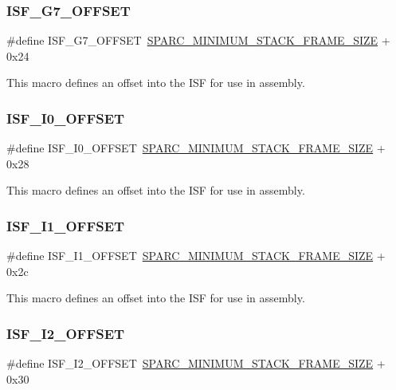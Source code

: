 \subsubsection{\texorpdfstring{ISF\_G7\_OFFSET}{ISF\_G7\_OFFSET}}
{\footnotesize\ttfamily \#define I\+S\+F\+\_\+\+G7\+\_\+\+O\+F\+F\+S\+ET~\mbox{\hyperlink{group__RTEMSScoreCPUSPARC_ga8e296685f05588131b26bdc695cb9b8c}{S\+P\+A\+R\+C\+\_\+\+M\+I\+N\+I\+M\+U\+M\+\_\+\+S\+T\+A\+C\+K\+\_\+\+F\+R\+A\+M\+E\+\_\+\+S\+I\+ZE}} + 0x24}

This macro defines an offset into the I\+SF for use in assembly. \mbox{\label{group__RTEMSScoreCPUSPARC_gace6b316101a61770e51654d9ebfac7ba}} 
\subsubsection{\texorpdfstring{ISF\_I0\_OFFSET}{ISF\_I0\_OFFSET}}
{\footnotesize\ttfamily \#define I\+S\+F\+\_\+\+I0\+\_\+\+O\+F\+F\+S\+ET~\mbox{\hyperlink{group__RTEMSScoreCPUSPARC_ga8e296685f05588131b26bdc695cb9b8c}{S\+P\+A\+R\+C\+\_\+\+M\+I\+N\+I\+M\+U\+M\+\_\+\+S\+T\+A\+C\+K\+\_\+\+F\+R\+A\+M\+E\+\_\+\+S\+I\+ZE}} + 0x28}

This macro defines an offset into the I\+SF for use in assembly. \mbox{\label{group__RTEMSScoreCPUSPARC_ga5c58bc3d42aeb317dc2dfd7e967a923b}} 
\subsubsection{\texorpdfstring{ISF\_I1\_OFFSET}{ISF\_I1\_OFFSET}}
{\footnotesize\ttfamily \#define I\+S\+F\+\_\+\+I1\+\_\+\+O\+F\+F\+S\+ET~\mbox{\hyperlink{group__RTEMSScoreCPUSPARC_ga8e296685f05588131b26bdc695cb9b8c}{S\+P\+A\+R\+C\+\_\+\+M\+I\+N\+I\+M\+U\+M\+\_\+\+S\+T\+A\+C\+K\+\_\+\+F\+R\+A\+M\+E\+\_\+\+S\+I\+ZE}} + 0x2c}

This macro defines an offset into the I\+SF for use in assembly. \mbox{\label{group__RTEMSScoreCPUSPARC_ga8b5cbda6e7e4ed02348bdbd8e93e7e2d}} 
\subsubsection{\texorpdfstring{ISF\_I2\_OFFSET}{ISF\_I2\_OFFSET}}
{\footnotesize\ttfamily \#define I\+S\+F\+\_\+\+I2\+\_\+\+O\+F\+F\+S\+ET~\mbox{\hyperlink{group__RTEMSScoreCPUSPARC_ga8e296685f05588131b26bdc695cb9b8c}{S\+P\+A\+R\+C\+\_\+\+M\+I\+N\+I\+M\+U\+M\+\_\+\+S\+T\+A\+C\+K\+\_\+\+F\+R\+A\+M\+E\+\_\+\+S\+I\+ZE}} + 0x30}

